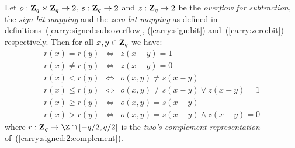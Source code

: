 \documentclass{article}
\newcommand{\zq}{\mbox{${\bf Z}_{q}$}}
\begin{document}
\begin{prop}\label{carry:signed:comparison}
  Let $o:\zq\times\zq\rightarrow 2$, $s:\zq\rightarrow 2$ and 
  $z:\zq\rightarrow 2$ be the {\em overflow for subtraction}, the
  {\em sign bit mapping} and the {\em zero bit mapping} as defined 
  in definitions~(\ref{carry:signed:sub:overflow}, 
  (\ref{carry:sign:bit}) and~(\ref{carry:zero:bit}) 
  respectively. Then for all $x,y\in\zq$ we have:
    \begin{eqnarray*}
      r(x) = r(y)&\Leftrightarrow&z(x-y)=1\\ 
      r(x)\neq r(y)&\Leftrightarrow&z(x-y)=0\\
      r(x) < r(y)&\Leftrightarrow&o(x,y)\neq s(x-y)\\
      r(x)\leq r(y)&\Leftrightarrow&o(x,y)\neq s(x-y)\lor z(x-y)=1\\
      r(x)\geq r(y)&\Leftrightarrow &o(x,y)=s(x-y)\\
      r(x)>r(y)&\Leftrightarrow&o(x,y)=s(x-y) \land z(x-y)=0
    \end{eqnarray*}
  where $r:\zq\rightarrow\Z\cap[-q/2,q/2[$ is the {\em two's complement
  representation} of~(\ref{carry:signed:2:complement}).
\end{prop}
\end{document}
